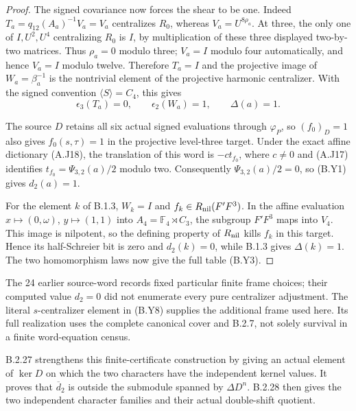 \begin{proof}
The signed covariance now forces the shear to be one.
Indeed $T_a=q_{12}(A_a)^{-1}V_a=V_a$ centralizes
$R_0$, whereas $V_a=U^{8\rho_a}$.  At three,
the only one of $I,U^2,U^4$ centralizing $R_0$ is
$I$, by multiplication of these three displayed
two-by-two matrices.  Thus $\rho_a=0$ modulo three;
$V_a=I$ modulo four automatically, and hence $V_a=I$
modulo twelve.  Therefore $T_a=I$ and the projective
image of $W_a=\beta_a^{-1}$ is the nontrivial element
of the projective harmonic centralizer.  With the
signed convention $\langle S\rangle=C_4$, this gives
\[
              \epsilon_3(T_a)=0,\qquad
              \epsilon_2(W_a)=1,\qquad\Delta(a)=1.
 \tag{B.Y10}
\]

The source $D$ retains all six actual signed evaluations
through $\varphi_P$, so $(f_0)_D=1$ also gives
$f_0(s,\tau)=1$ in the projective level-three target.
Under the exact affine dictionary (A.J18), the
translation of this word is $-c t_{f_0}$, where
$c\ne0$ and (A.J17) identifies
$t_{f_0}=\Psi_{3,2}(a)/2$ modulo two.  Consequently
$\Psi_{3,2}(a)/2=0$, so (B.Y1) gives $d_2(a)=1$.

For the element $k$ of B.1.3, $W_k=I$ and
$f_k\in R_{\rm nil}(F'F^3)$.  In the affine
evaluation $x\mapsto(0,\omega)$, $y\mapsto(1,1)$
into $A_4=\mathbb F_4\rtimes C_3$, the subgroup
$F'F^3$ maps into $V_4$.  This image is nilpotent,
so the defining property of $R_{\rm nil}$ kills
$f_k$ in this target.  Hence its half-Schreier bit
is zero and $d_2(k)=0$, while B.1.3 gives
$\Delta(k)=1$.  The two homomorphism laws now give
the full table (B.Y3).
\end{proof}

The 24 earlier source-word records fixed particular
finite frame choices; their computed value $d_2=0$
did not enumerate every pure centralizer adjustment.
The literal $s$-centralizer element in (B.Y8) supplies
the additional frame used here.  Its full realization
uses the complete canonical cover and B.2.7, not
solely survival in a finite word-equation census.

B.2.27 strengthens this finite-certificate construction
by giving an actual element of $\ker D$ on which the
two characters have the independent kernel values.
It proves that $\overline d_2$ is outside the submodule
spanned by $\Delta D^n$.  B.2.28 then gives the two
independent character families and their actual
double-shift quotient.
